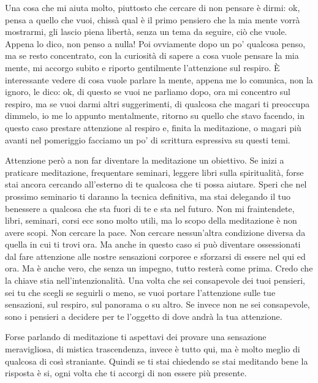 \documentclass[12pt]{book} %
\begin{document}
Una cosa che mi aiuta molto, piuttosto che cercare di non pensare è dirmi: ok, pensa a quello che vuoi, chissà qual è il
primo pensiero che la mia mente vorrà mostrarmi, gli lascio piena libertà, senza un tema da seguire, ciò che vuole.
Appena lo dico, non penso a nulla! Poi ovviamente dopo un po' qualcosa penso, ma se resto
concentrato, con la curiosità di sapere a cosa vuole pensare la mia mente, mi accorgo subito e riporto gentilmente
l'attenzione sul respiro. È interessante vedere di cosa vuole parlare la mente, appena me lo
comunica, non la ignoro, le dico: ok, di questo se vuoi ne parliamo dopo, ora mi concentro sul respiro, ma se vuoi
darmi altri suggerimenti, di qualcosa che magari ti preoccupa dimmelo, io me lo appunto mentalmente, ritorno su quello
che stavo facendo, in questo caso prestare attenzione al respiro e, finita la meditazione, o magari più avanti nel
pomeriggio facciamo un po' di scrittura espressiva su questi temi. 

Attenzione però a non far diventare la meditazione un obiettivo. Se inizi a praticare meditazione, frequentare seminari,
leggere libri sulla spiritualità, forse stai ancora cercando all'esterno di te qualcosa che ti
possa aiutare. Speri che nel prossimo seminario ti daranno la tecnica definitiva, ma stai delegando il tuo benessere a
qualcosa che sta fuori di te e sta nel futuro. Non mi fraintendete, libri, seminari, corsi ecc sono molto utili, ma lo
scopo della meditazione è non avere scopi. Non cercare la pace. Non cercare nessun'altra
condizione diversa da quella in cui ti trovi ora. Ma anche in questo caso si può diventare ossessionati dal fare
attenzione alle nostre sensazioni corporee e sforzarsi di essere nel qui ed ora. Ma è anche vero, che senza un impegno,
tutto resterà come prima. Credo che la chiave stia nell'intenzionalità. Una volta che sei
consapevole dei tuoi pensieri, sei tu che scegli se seguirli o meno, se vuoi portare l'attenzione
sulle tue sensazioni, sul respiro, sul panorama o su altro. Se invece non ne sei consapevole, sono i pensieri a
decidere per te l'oggetto di dove andrà la tua attenzione.

Forse parlando di meditazione ti aspettavi dei provare una sensazione meravigliosa, di mistica trascendenza, invece è
tutto qui, ma è molto meglio di qualcosa di così straniante. Quindi se ti stai chiedendo se stai meditando bene la
risposta è si, ogni volta che ti accorgi di non essere più presente.
\end{document}
